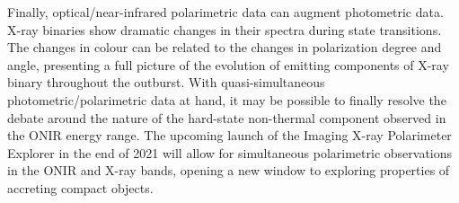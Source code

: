 Finally, optical/near-infrared polarimetric data can augment photometric data. 
X-ray binaries show dramatic changes in their spectra during state transitions.
The changes in colour can be related to the changes in polarization degree and angle, presenting a full picture of the evolution of emitting components of X-ray binary throughout the outburst.
With quasi-simultaneous photometric/polarimetric data at hand, it may be possible to finally resolve the debate around the nature of the hard-state non-thermal component observed in the ONIR energy range. 
The upcoming launch of the Imaging X-ray Polarimeter Explorer in the end of 2021 will allow for simultaneous polarimetric observations in the ONIR and X-ray bands, opening a new window to exploring properties of accreting compact objects.
